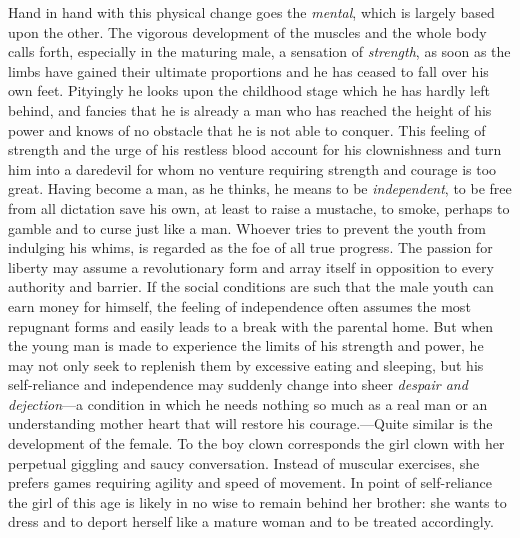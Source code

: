 Hand in hand with this physical change goes the \emph{mental}, which is largely based upon the other. The vigorous development of the muscles and the whole body calls forth, especially in the maturing male, a sensation of \emph{strength}, as soon as the limbs have gained their ultimate proportions and he has ceased to fall over his own feet. Pityingly he looks upon the childhood stage which he has hardly left behind, and fancies that he is already a man who has reached the height of his power and knows of no obstacle that he is not able to conquer. This feeling of strength and the urge of his restless blood account for his clownishness and turn him into a daredevil for whom no venture requiring strength and courage is too great. Having become a man, as he thinks, he means to be \emph{independent}, to be free from all dictation save his own, at least to raise a mustache, to smoke, perhaps to gamble and to curse just like a man. Whoever tries to prevent the youth from indulging his whims, is regarded as the foe of all true progress. The passion for liberty may assume a revolutionary form and array itself in opposition to every authority and barrier. If the social conditions are such that the male youth can earn money for himself, the feeling of independence often assumes the most repugnant forms and easily leads to a break with the parental home. But when the young man is made to experience the limits of
his strength and power, he may not only seek to replenish them by excessive eating and sleeping, but his self-reliance and independence may suddenly change into sheer \emph{despair and dejection}—a condition in which he needs nothing so much as a real man or an understanding mother heart that will restore his courage.—Quite similar is the development of the female. To the boy clown corresponds the girl clown with her perpetual giggling and saucy conversation. Instead of muscular exercises, she prefers games requiring agility and speed of movement. In point of self-reliance the girl of this age is likely in no wise to remain behind her brother: she wants to dress and to deport herself like a mature woman and to be treated accordingly.

